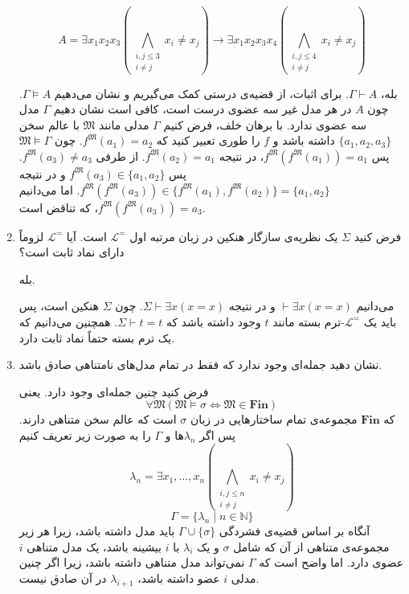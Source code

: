 \documentclass[12pt, 14paper]{article}
\begin{document}
\begin{enumerate}
\begin{ans}
    $$A = \exists x_1 x_2 x_3 (\bigwedge_{\substack{i,j \leq 3 \\ i \neq j}} x_i \neq x_j) \rightarrow \exists x_1 x_2 x_3 x_4 (\bigwedge_{\substack{i,j \leq 4 \\ i \neq j}} x_i \neq x_j)$$

    بله، $\Gamma \vdash A$. برای اثبات، از قضیه‌ی درستی کمک می‌گیریم و نشان می‌دهیم $\Gamma \vDash A$. چون $A$ در هر مدل غیر سه عضوی درست است، کافی است نشان دهیم $\Gamma$ مدل سه عضوی ندارد. با برهان خلف، فرض کنیم $\Gamma$ مدلی مانند $\mathfrak{M}$ با عالم سخن $\{ a_1, a_2, a_3 \}$ داشته باشد و $f$ را طوری تعبیر کنید که $f^\mathfrak{M}(a_1) = a_2$. چون $\mathfrak{M} \vDash \Gamma$ پس $f^\mathfrak{M}(f^\mathfrak{M}(a_1)) = a_1$، در نتیجه $f^\mathfrak{M}(a_2) = a_1$. از طرفی $f^\mathfrak{M}(a_3) \neq a_3$. پس $f^\mathfrak{M}(a_3) \in \{ a_1, a_2 \}$ و در نتیجه $f^\mathfrak{M}(f^\mathfrak{M}(a_3)) \in \{ f^\mathfrak{M}(a_1), f^\mathfrak{M}(a_2) \} = \{ a_1, a_2 \}$. اما می‌دانیم $f^\mathfrak{M}(f^\mathfrak{M}(a_3)) = a_3$، که تناقض است.
\end{ans}

\item فرض کنید $\Sigma$ یک نظریه‌ی سازگار هنکین در زبان مرتبه اول $\mathcal{L}^=$ است. آیا $\mathcal{L}^=$ لزوماً دارای نماد ثابت است؟
\begin{ans}
  بله.
  
  می‌دانیم $\vdash \exists x (x = x)$ و در نتیجه $\Sigma \vdash \exists x (x = x)$. چون $\Sigma$ هنکین است، پس باید یک $\mathcal{L}^=$-ترم بسته مانند $t$ وجود داشته باشد که $\Sigma \vdash t = t$. همچنین می‌دانیم که یک ترم بسته حتماً نماد ثابت دارد.
\end{ans}

\item نشان دهید جمله‌ای وجود ندارد که فقط در تمام مدل‌های نامتناهی صادق باشد.
\begin{ans}
  فرض کنید چنین جمله‌ای وجود دارد. یعنی
  $$ \forall \mathfrak{M} (\mathfrak{M} \vDash \sigma \iff \mathfrak{M} \in \mathbf{Fin}) $$
  که $\mathbf{Fin}$ مجموعه‌ی تمام ساختارهایی در زبان $\sigma$ است که  عالم سخن متناهی دارند. پس اگر $\lambda_n$ها و $\Gamma$ را به صورت زیر تعریف کنیم
  $$ \lambda_n = \exists x_1, \dots, x_n (\bigwedge_{\substack{i,j \leq n \\ i \neq j}} x_i \neq x_j) $$
  $$ \Gamma = \{ \lambda_n \mid n \in \mathbb{N} \} $$
  آنگاه بر اساس قضیه‌ی فشردگی $\Gamma \cup \{ \sigma \}$ باید مدل داشته باشد، زیرا هر زیر مجموعه‌ی متناهی از آن که شامل $\sigma$ و یک $\lambda_i$ با $i$ بیشینه باشد، یک مدل متناهی $i$ عضوی دارد. اما واضح است که $\Gamma$ نمی‌تواند مدل متناهی داشته باشد، زیرا اگر چنین مدلی $i$ عضو داشته باشد، $\lambda_{i+1}$ در آن صادق نیست.
\end{ans}

\end{enumerate}
\end{document}
